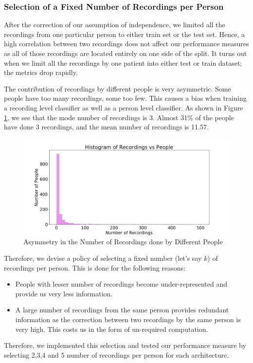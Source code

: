 \subsubsection{Selection of a Fixed Number of Recordings per Person}
After the correction of our assumption of independence, we limited all the recordings from one particular person to either train set or the test set. Hence, a high correlation between two recordings does not affect our performance measures as all of those recordings are located entirely on one side of the split. It turns out when we limit all the recordings by one patient into either test or train dataset; the metrics drop rapidly.

The contribution of recordings by different people is very asymmetric. Some people have too many recordings, some too few. This causes a bias when training a recording level classifier as well as a person level classifier. As shown in Figure \ref{fig:park_asymm}, we see that the mode number of recordings is 3. Almost 31\% of the people have done 3 recordings, and the mean number of recordings is 11.57. 
\begin{figure}[htbp]
  \centering
  \includegraphics[width=\textwidth]{./Figures/park_asymm.png}
  \caption{Asymmetry in the Number of Recordings done by Different People}
  \label{fig:park_asymm}
\end{figure}
Therefore, we devise a policy of selecting a fixed number (let's say $k$) of recordings per person. This is done for the following reasons:
\begin{itemize}
\item People with lesser number of recordings become under-represented and provide us very less information.
\item A large number of recordings from the same person provides redundant information as the correction between two recordings by the same person is very high. This costs us in the form of un-required computation.
\end{itemize}
Therefore, we implemented this selection and tested our performance measure by selecting 2,3,4 and 5 number of recordings per person for each architecture. 
